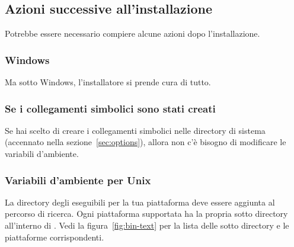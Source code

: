 \documentclass{article}
\begin{document}
\subsection{Azioni successive all'installazione}
\label{sec:postinstall}

Potrebbe essere necessario compiere alcune azioni dopo l'installazione.

\subsubsection{Windows}

Ma sotto Windows, l'installatore si prende cura di tutto.

\subsubsection{Se i collegamenti simbolici sono stati creati}

Se hai scelto di creare i collegamenti simbolici nelle directory di
sistema (accennato nella sezione~\ref{sec:options}), allora non c'è
bisogno di modificare le variabili d'ambiente.

\subsubsection{Variabili d'ambiente per Unix}
\label{sec:env}

La directory degli eseguibili per la tua piattaforma deve essere aggiunta
al percorso di ricerca. Ogni piattaforma supportata ha la propria sotto
directory all'interno di . Vedi la
figura~\ref{fig:bin-text} per la lista delle sotto directory e le
piattaforme corrispondenti.
\end{document}
